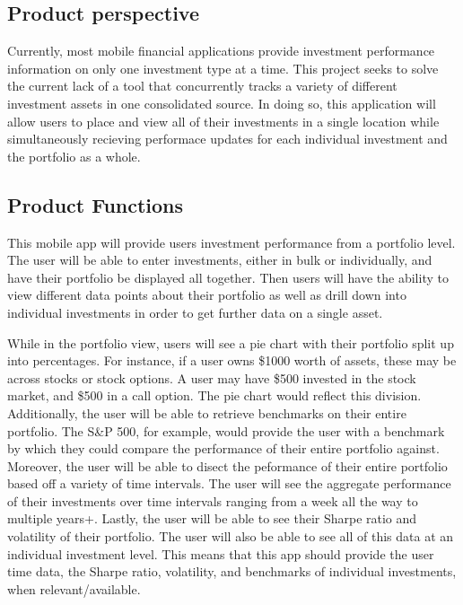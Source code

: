 \documentclass[onecolumn, draftclsnofoot,10pt, compsoc]{IEEEtran}
\begin{document}
\subsection{Product perspective}

Currently, most mobile financial applications provide investment performance information on only one investment type at a time. 
This project seeks to solve the current lack of a tool that concurrently tracks a variety of different investment assets in 
one consolidated source. In doing so, this application will allow users to place and view all of their investments in a single location 
while simultaneously recieving performace updates for each individual investment and the portfolio as a whole.

\subsection{Product Functions}
This mobile app will provide users investment performance from a portfolio level. The user will be able to enter investments, either 
in bulk or individually, and have their portfolio be displayed all together. Then users will have the ability to view different data
points about their portfolio as well as drill down into individual investments in order to get further data on a single asset.

While in the portfolio view, users will see a pie chart with their portfolio split up into percentages. 
For instance, if a user owns \$1000 worth of assets, these may be across stocks or stock options. A user may have \$500 invested in the stock market, 
and \$500 in a call option. The pie chart would reflect this division. Additionally, the user will be able to retrieve benchmarks on their entire portfolio. 
The S\&P 500, for example, would provide the user with a benchmark by which they could compare the performance of their entire portfolio against. 
Moreover, the user will be able to disect the peformance of their entire portfolio based off a variety of time intervals. The user will see the aggregate 
performance of their investments over time intervals ranging from a week all the way to multiple years+. Lastly, the user will be able to see their Sharpe ratio and volatility of their portfolio. 
The user will also be able to see all of this data at an individual investment level. This means that this app should provide the user 
time data, the Sharpe ratio, volatility, and benchmarks of individual investments, when relevant/available.
\end{document}
